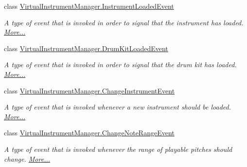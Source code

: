 \begin{DoxyCompactItemize}
class \hyperlink{group___virtual_instrument_manager_class_virtual_instrument_manager_1_1_instrument_loaded_event}{Virtual\+Instrument\+Manager.\+Instrument\+Loaded\+Event}
\begin{DoxyCompactList}\small\item\em A type of event that is invoked in order to signal that the instrument has loaded.  \hyperlink{group___virtual_instrument_manager_class_virtual_instrument_manager_1_1_instrument_loaded_event}{More...}\end{DoxyCompactList}\item 
class \hyperlink{group___virtual_instrument_manager_class_virtual_instrument_manager_1_1_drum_kit_loaded_event}{Virtual\+Instrument\+Manager.\+Drum\+Kit\+Loaded\+Event}
\begin{DoxyCompactList}\small\item\em A type of event that is invoked in order to signal that the drum kit has loaded.  \hyperlink{group___virtual_instrument_manager_class_virtual_instrument_manager_1_1_drum_kit_loaded_event}{More...}\end{DoxyCompactList}\item 
class \hyperlink{group___virtual_instrument_manager_class_virtual_instrument_manager_1_1_change_instrument_event}{Virtual\+Instrument\+Manager.\+Change\+Instrument\+Event}
\begin{DoxyCompactList}\small\item\em A type of event that is invoked whenever a new instrument should be loaded.  \hyperlink{group___virtual_instrument_manager_class_virtual_instrument_manager_1_1_change_instrument_event}{More...}\end{DoxyCompactList}\item 
class \hyperlink{group___virtual_instrument_manager_class_virtual_instrument_manager_1_1_change_note_range_event}{Virtual\+Instrument\+Manager.\+Change\+Note\+Range\+Event}
\begin{DoxyCompactList}\small\item\em A type of event that is invoked whenever the range of playable pitches should change.  \hyperlink{group___virtual_instrument_manager_class_virtual_instrument_manager_1_1_change_note_range_event}{More...}\end{DoxyCompactList}\end{DoxyCompactItemize}
